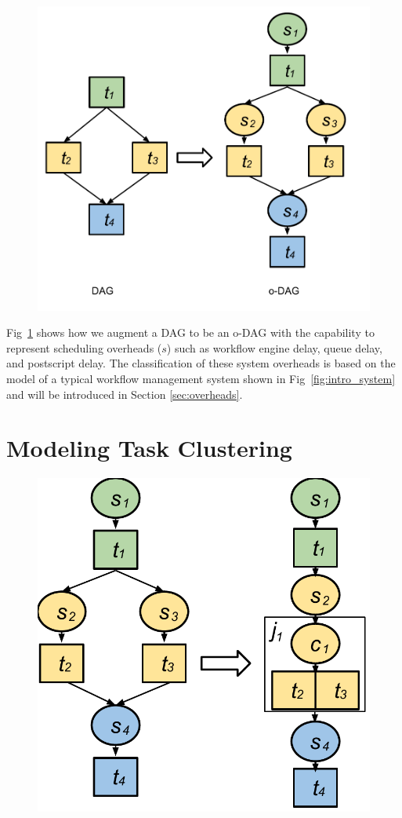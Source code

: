 \begin{figure}[h!]
\includegraphics[width=0.6\linewidth]{figures/model/odag.pdf}
\centering
  \label{fig:model_odag}
\end{figure}

Fig~\ref{fig:model_odag} shows how we augment a DAG to be an o-DAG with the capability to represent scheduling overheads ($s$) such as workflow engine delay, queue delay, and postscript delay. The classification of these system overheads is based on the model of a typical workflow management system shown in Fig~\ref{fig:intro_system} and will be introduced in Section \ref{sec:overheads}. 


\section{Modeling Task Clustering}
\label{sec:task_clustering}

\begin{figure}[h!]
\centering
 \includegraphics[width=0.5\linewidth]{figures/introduction/hc.pdf}
  \label{fig:intro_hc}
\end{figure}


